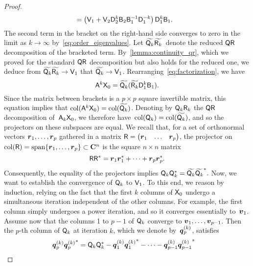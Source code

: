 \begin{proof}
\begin{align}
        \label{eq:factorization}
        &= \left(\mathsf V_1  + \mathsf V_2 \mathsf D_2^{k} \mathsf B_2 \mathsf B_1^{-1}\mathsf D_1^{-k}\right) \mathsf D_1^k \mathsf B_1.
    \end{align}
    The second term in the bracket on the right-hand side converges to zero in the limit as $k \to \infty$ by~\eqref{eq:order_eigenvalues}.
    Let $\widetilde{\mathsf Q_k} \widetilde {\mathsf R_k}$~denote the reduced $\mathsf Q \mathsf R$ decomposition of the bracketed term.
    By~\cref{lemma:continuity_qr},
    which we proved for the standard $\mathsf Q \mathsf R$ decomposition but also holds for the reduced one,
    we deduce from $\widetilde{\mathsf Q_k} \widetilde{\mathsf R_k} \to \mathsf V_1$ that $\widetilde{\mathsf Q_k} \to \mathsf V_1$.
    Rearranging~\eqref{eq:factorization},
    we have
    \[
        \mathsf A^k \mathsf X_0 = \widetilde{\mathsf Q_k} (\widetilde{\mathsf R_k} \mathsf D_1^k \mathsf B_1).
    \]
    Since the matrix between brackets is a $p \times p$ square invertible matrix,
    this equation implies that $\operatorname{col}(\mathsf A^k \mathsf X_0) = \operatorname{col} (\widetilde{\mathsf Q_k})$.
    Denoting by $\mathsf Q_k \mathsf R_k$ the $\mathsf Q \mathsf R$ decomposition of~$\mathsf A_k \mathsf X_0$,
    we therefore have~$\operatorname{col}(\mathsf Q_k) = \operatorname{col}(\widetilde {\mathsf Q_k})$,
    and so the projectors on these subspaces are equal.
    We recall that, for a set of orthonormal vectors $\mathbf{\boldsymbol{r}}_1, \dotsc, \mathbf{\boldsymbol{r}}_p$
    gathered in a matrix $\mathsf R = \begin{pmatrix} \mathbf{\boldsymbol{r}}_1 & \hdots & \mathbf{\boldsymbol{r}}_p \end{pmatrix}$,
    the projector on $\operatorname{col}(\mathsf R) = \operatorname{span} \{\mathbf{\boldsymbol{r}}_1, \dotsc, \mathbf{\boldsymbol{r}}_p \} \subset \mathbf C^n$
    is the square $n \times n$ matrix
    \[
        \mathsf R \mathsf R^*
        = \mathbf{\boldsymbol{r}}_1 \mathbf{\boldsymbol{r}}_1^* + \dotsb + \mathbf{\boldsymbol{r}}_p \mathbf{\boldsymbol{r}}_p^*.
    \]
    Consequently,
    the equality of the projectors implies
    \(
        \mathsf Q_k \mathsf Q_k^* = \widetilde{\mathsf Q_k} \widetilde {\mathsf Q_k}^*.
    \)
    Now, we want to establish the convergence of $\mathsf Q_k$ to $\mathsf V_1$.
    To this end, we reason by induction,
    relying on the fact that the first $k$ columns of $\mathsf X_0$ undergo a simultaneous iteration independent of the other columns.
    For example, the first column simply undergoes a power iteration, and so it converges essentially to~$\mathbf{\boldsymbol{v}}_1$.
    Assume now that the columns 1 to $p-1$ of $\mathsf Q_k$ converge to $\mathbf{\boldsymbol{v}}_1, \dotsc, \mathbf{\boldsymbol{v}}_{p-1}$.
    Then the $p$-th column of $\mathsf Q_k$ at iteration $k$,
    which we denote by~$\mathbf{\boldsymbol{q}}_p^{(k)}$,
    satisfies
    \begin{align*}
        \vect q_p^{(k)} {\vect q_p^{(k)}}^* &= \mat Q_k \mat Q_k^* - \vect q_1^{(k)} {\vect q_1^{(k)}}^* - \dotsb - \vect q_{p-1}^{(k)} {\vect q_{p-1}^{(k)}}^*

\end{align*}
\end{proof}
